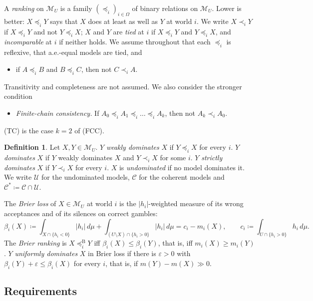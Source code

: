\documentclass[11pt]{article}
\newcommand{\M}{\mathcal{M}}
\newcommand{\CC}{\mathcal{C}}
\newcommand{\UU}{\mathcal{U}}
\theoremstyle{plain}
\theoremstyle{definition}
\newtheorem{definition}[theorem]{Definition}
\theoremstyle{remark}
\begin{document}
A \emph{ranking} on $\M_U$ is a family $(\preceq_i)_{i\in\Omega}$ of binary relations on
$\M_U$. Lower is better: $X\preceq_iY$ says that $X$ does at least as well as $Y$ at
world $i$. We write $X\prec_iY$ if $X\preceq_iY$ and not $Y\preceq_iX$; $X$ and $Y$ are
\emph{tied} at $i$ if $X\preceq_iY$ and $Y\preceq_iX$, and \emph{incomparable} at $i$ if
neither holds. We assume throughout that each $\preceq_i$ is reflexive, that a.e.-equal
models are tied, and
\begin{itemize}
  \item[(TC)] if $A\preceq_iB$ and $B\preceq_iC$, then not $C\prec_iA$.
\end{itemize}
Transitivity and completeness are not assumed. We also consider the stronger condition
\begin{itemize}
  \item[(FCC)] \emph{Finite-chain consistency.} If $A_0\preceq_iA_1\preceq_i\dots
  \preceq_iA_k$, then not $A_k\prec_iA_0$.
\end{itemize}
(TC) is the case $k=2$ of (FCC).

\begin{definition}\label{def:dom}
Let $X,Y\in\M_U$. $Y$ \emph{weakly dominates} $X$ if $Y\preceq_iX$ for every $i$. $Y$
\emph{dominates} $X$ if $Y$ weakly dominates $X$ and $Y\prec_iX$ for some $i$. $Y$
\emph{strictly dominates} $X$ if $Y\prec_iX$ for every $i$. $X$ is \emph{undominated} if
no model dominates it. We write $\UU$ for the undominated models, $\CC$ for the coherent
models and $\CC^\ast\coloneqq\CC\cap\UU$.
\end{definition}

The \emph{Brier loss} of $X\in\M_U$ at world $i$ is the $|h_i|$-weighted measure of its
wrong acceptances and of its silences on correct gambles:
\[
  \beta_i(X)\coloneqq\int_{X\cap\{h_i<0\}}|h_i|\,d\mu
  +\int_{(U\setminus X)\cap\{h_i>0\}}|h_i|\,d\mu=c_i-m_i(X),\qquad
  c_i\coloneqq\int_{U\cap\{h_i>0\}}h_i\,d\mu .
\]
The \emph{Brier ranking} is $X\preceq^{\mathrm B}_iY$ iff $\beta_i(X)\le\beta_i(Y)$, that
is, iff $m_i(X)\ge m_i(Y)$. $Y$ \emph{uniformly dominates} $X$ in Brier loss if there is
$\varepsilon>0$ with $\beta_i(Y)+\varepsilon\le\beta_i(X)$ for every $i$, that is, if
$m(Y)-m(X)\gg0$.

\subsection{Requirements}
\end{document}
